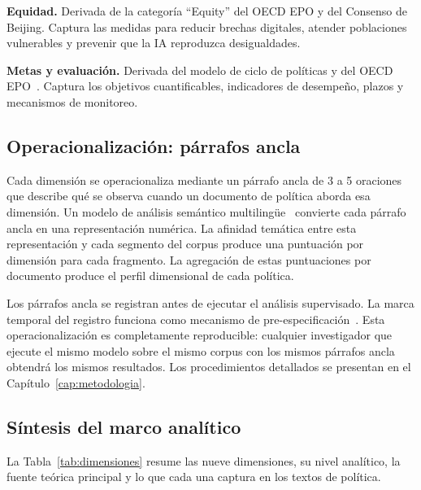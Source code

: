 \textbf{Equidad.} Derivada de la categoría ``Equity'' del OECD EPO y del Consenso de Beijing. Captura las medidas para reducir brechas digitales, atender poblaciones vulnerables y prevenir que la IA reproduzca desigualdades.

\textbf{Metas y evaluación.} Derivada del modelo de ciclo de políticas y del OECD EPO~\citep{howlett2003studying,oecd2021epo}. Captura los objetivos cuantificables, indicadores de desempeño, plazos y mecanismos de monitoreo.


\subsection{Operacionalización: párrafos ancla}

Cada dimensión se operacionaliza mediante un párrafo ancla de 3 a 5 oraciones que describe qué se observa cuando un documento de política aborda esa dimensión. Un modelo de análisis semántico multilingüe~\citep{reimers2019sentencebert} convierte cada párrafo ancla en una representación numérica. La afinidad temática entre esta representación y cada segmento del corpus produce una puntuación por dimensión para cada fragmento. La agregación de estas puntuaciones por documento produce el perfil dimensional de cada política.

Los párrafos ancla se registran antes de ejecutar el análisis supervisado. La marca temporal del registro funciona como mecanismo de pre-especificación~\citep{nosek2018preregistration}. Esta operacionalización es completamente reproducible: cualquier investigador que ejecute el mismo modelo sobre el mismo corpus con los mismos párrafos ancla obtendrá los mismos resultados. Los procedimientos detallados se presentan en el Capítulo~\ref{cap:metodologia}.


\subsection{Síntesis del marco analítico}

La Tabla~\ref{tab:dimensiones} resume las nueve dimensiones, su nivel analítico, la fuente teórica principal y lo que cada una captura en los textos de política.

